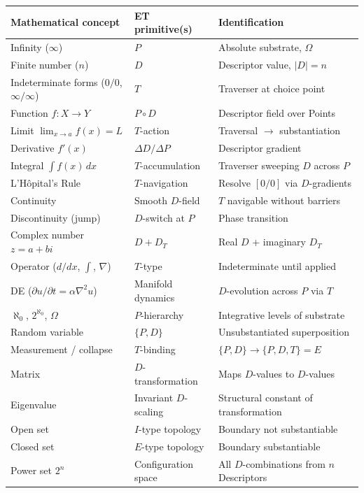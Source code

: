 \documentclass[11pt,a4paper]{article}
\theoremstyle{definition}
\theoremstyle{remark}
\begin{document}
\begin{center}
\small
\begin{tabular}{lll}
\toprule
\textbf{Mathematical concept} & \textbf{ET primitive(s)} & \textbf{Identification} \\
\midrule
Infinity ($\infty$) & $P$ & Absolute substrate, $\Omega$ \\
Finite number ($n$) & $D$ & Descriptor value, $|D| = n$ \\
Indeterminate forms ($0/0$, $\infty/\infty$) & $T$ & Traverser at choice point \\
Function $f: X \to Y$ & $P \circ D$ & Descriptor field over Points \\
Limit $\lim_{x \to a} f(x) = L$ & $T$-action & Traversal $\to$ substantiation \\
Derivative $f'(x)$ & $\Delta D / \Delta P$ & Descriptor gradient \\
Integral $\int f(x)\,dx$ & $T$-accumulation & Traverser sweeping $D$ across $P$ \\
L'H\^opital's Rule & $T$-navigation & Resolve $[0/0]$ via $D$-gradients \\
Continuity & Smooth $D$-field & $T$ navigable without barriers \\
Discontinuity (jump) & $D$-switch at $P$ & Phase transition \\
Complex number $z = a + bi$ & $D + D_{T}$ & Real $D$ + imaginary $D_{T}$ \\
Operator ($d/dx$, $\int$, $\nabla$) & $T$-type & Indeterminate until applied \\
DE ($\partial u/\partial t = \alpha \nabla^{2} u$) & Manifold dynamics & $D$-evolution across $P$ via $T$ \\
$\aleph_{0}$, $2^{\aleph_{0}}$, $\Omega$ & $P$-hierarchy & Integrative levels of substrate \\
Random variable & $\{P,D\}$ & Unsubstantiated superposition \\
Measurement / collapse & $T$-binding & $\{P,D\} \to \{P,D,T\} = E$ \\
Matrix & $D$-transformation & Maps $D$-values to $D$-values \\
Eigenvalue & Invariant $D$-scaling & Structural constant of transformation \\
Open set & $I$-type topology & Boundary not substantiable \\
Closed set & $E$-type topology & Boundary substantiable \\
Power set $2^{n}$ & Configuration space & All $D$-combinations from $n$ Descriptors \\

\end{tabular}
\end{center}
\end{document}
